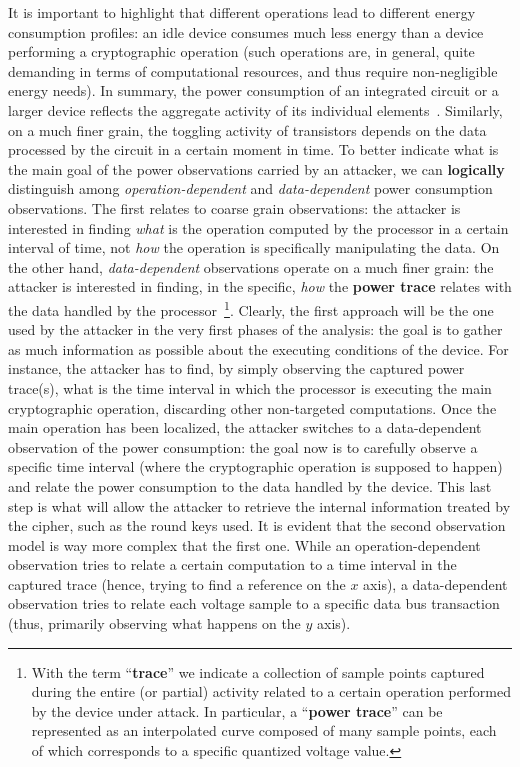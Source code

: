         It is important to highlight that different operations lead to different energy consumption profiles: an idle device consumes much less energy than a device performing a cryptographic operation (such operations are, in general, quite demanding in terms of computational resources, and thus require non-negligible energy needs). In summary, the power consumption of an integrated circuit or a larger device reflects the aggregate activity of its individual elements~\cite{kocher2011introduction}. Similarly, on a much finer grain, the toggling activity of transistors depends on the data processed by the circuit in a certain moment in time. To better indicate what is the main goal of the power observations carried by an attacker, we can \textbf{logically} distinguish among \emph{operation-dependent} and \emph{data-dependent} power consumption observations. The first relates to coarse grain observations: the attacker is interested in finding \emph{what} is the operation computed by the processor in a certain interval of time, not \emph{how} the operation is specifically manipulating the data. On the other hand, \emph{data-dependent} observations operate on a much finer grain: the attacker is interested in finding, in the specific, \emph{how} the \textbf{power trace} relates with the data handled by the processor~\footnote{With the term ``\textbf{trace}'' we indicate a collection of sample points captured during the entire (or partial) activity related to a certain operation performed by the device under attack. In particular, a ``\textbf{power trace}'' can be represented as an interpolated curve composed of many sample points, each of which corresponds to a specific quantized voltage value.}. Clearly, the first approach will be the one used by the attacker in the very first phases of the analysis: the goal is to gather as much information as possible about the executing conditions of the device. For instance, the attacker has to find, by simply observing the captured power trace(s), what is the time interval in which the processor is executing the main cryptographic operation, discarding other non-targeted computations. Once the main operation has been localized, the attacker switches to a data-dependent observation of the power consumption: the goal now is to carefully observe a specific time interval (where the cryptographic operation is supposed to happen) and relate the power consumption to the data handled by the device. This last step is what will allow the attacker to retrieve the internal information treated by the cipher, such as the round keys used. It is evident that the second observation model is way more complex that the first one. While an operation-dependent observation tries to relate a certain computation to a time interval in the captured trace (hence, trying to find a reference on the $x$ axis), a data-dependent observation tries to relate each voltage sample to a specific data bus transaction (thus, primarily observing what happens on the $y$ axis).
        
